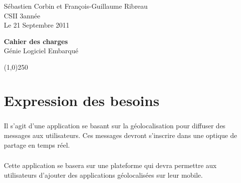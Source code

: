\documentclass[a4paper,12pt]{report}
\begin{document}
  \begin{onehalfspace}

    \begin{titlepage}
      \begin{center}
        Sébastien Corbin et François-Guillaume Ribreau\\
        CSII 3\ieme année\\
    		Le 21 Septembre 2011\\
      \end{center}
      \hrulefill
      \vspace{7cm}
      \begin{center}
        \LARGE \textbf{Cahier des charges}\\
        \vspace{3cm}
        \normalsize Génie Logiciel Embarqué
      \end{center}

      \vspace{9,5cm}

      \begin{center}
      \line(1,0){250}
      \end{center}

      \begin{center}
      \tiny{\currfilename}
      \end{center}


    \end{titlepage}
    \clearpage

  \thispagestyle{empty}
  \setcounter{page}{0}
  \clearpage

	\chapter*{Expression des besoins}
	
	\paragraph*{}
	Il s'agit d'une application se basant sur la géolocalisation pour diffuser des messages aux utilisateurs. Ces messages devront s'inscrire dans une optique de partage en temps réel.
	
	\paragraph*{}
	Cette application se basera sur une plateforme qui devra permettre aux utilisateurs d'ajouter des applications géolocalisées sur leur mobile.		


\end{onehalfspace}
\end{document}
